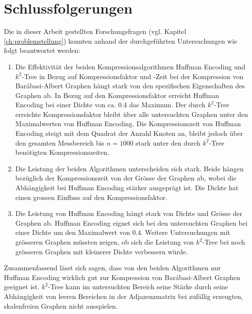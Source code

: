\documentclass{ffhsthesis}
\begin{document}
\chapter{Schlussfolgerungen} %
Die in dieser Arbeit gestellten Forschungsfragen (vgl. Kapitel \ref{ch:problemstellung}) konnten anhand der durchgeführten Untersuchungen wie folgt beantwortet werden:
\begin{enumerate}
    \item Die Effektivität der beiden Kompressionsalgorithmen Huffman Encoding und $k^2$-Tree in Bezug auf Kompressionsfaktor und -Zeit bei der Kompression von Barábasi-Albert Graphen hängt stark von den spezifischen Eigenschaften des Graphen ab. In Bezug auf den Kompressionsfaktor erreicht Huffman Encoding bei einer Dichte von ca. 0.4 das Maximum. Der durch $k^2$-Tree erreichte Kompressionsfaktor bleibt über alle untersuchten Graphen unter den Maximalwerten von Huffman Encoding. Die Kompressionszeit von Huffman Encoding steigt mit dem Quadrat der Anzahl Knoten an, bleibt jedoch über den gesamten Messbereich bis $n=1000$ stark unter den durch $k^2$-Tree benötigten Kompressionszeiten. 
    \item Die Leistung der beiden Algorithmen unterscheiden sich stark. Beide hängen bezüglich der Kompressionszeit von der Grösse der Graphen ab, wobei die Abhängigkeit bei Huffman Encoding stärker ausgeprägt ist. Die Dichte hat einen grossen Einfluss auf den Kompressionsfaktor. 
    \item Die Leistung von Huffman Encoding hängt stark von Dichte und Grösse der Graphen ab. Huffman Encoding eignet sich bei den untersuchten Graphen bei einer Dichte um den Maximalwert von $0.4$. Weitere Untersuchungen mit grösseren Graphen müssten zeigen, ob sich die Leistung von $k^2$-Tree bei noch grösseren Graphen mit kleinerer Dichte verbessern würde.
\end{enumerate}
Zusammenfassend lässt sich sagen, dass von den beiden Algorithmen nur Huffman Encoding wirklich gut zur Kompression von Barábasi-Albert Graphen geeignet ist. $k^2$-Tree kann im untersuchten Bereich seine Stärke durch seine Abhängigkeit von leeren Bereichen in der Adjazenzmatrix bei zufällig erzeugten, skalenfreien Graphen nicht ausspielen. 
\end{document}

